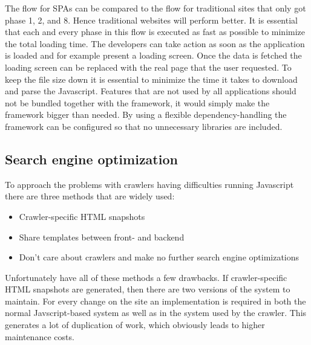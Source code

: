 The flow for SPAs can be compared to the flow for traditional sites that only got phase 1, 2, and 8. Hence traditional websites will perform better. It is essential that each and every phase in this flow is executed as fast as possible to minimize the total loading time. The developers can take action as soon as the application is loaded and for example present a loading screen. Once the data is fetched the loading screen can be replaced with the real page that the user requested. To keep the file size down it is essential to minimize the time it takes to download and parse the Javascript. Features that are not used by all applications should not be bundled together with the framework, it would simply make the framework bigger than needed. By using a flexible dependency-handling the framework can be configured so that no unnecessary libraries are included.

\subsection{Search engine optimization}

To approach the problems with crawlers having difficulties running Javascript there are three methods that are widely used:

\begin{itemize}
	\item Crawler-specific HTML snapshots
	\item Share templates between front- and backend
	\item Don't care about crawlers and make no further search engine optimizations
\end{itemize}

Unfortunately have all of these methods a few drawbacks. If crawler-specific HTML snapshots are generated, then there are two versions of the system to maintain. For every change on the site an implementation is required in both the normal Javscript-based system as well as in the system used by the crawler. This generates a lot of duplication of work, which obviously leads to higher maintenance costs.


